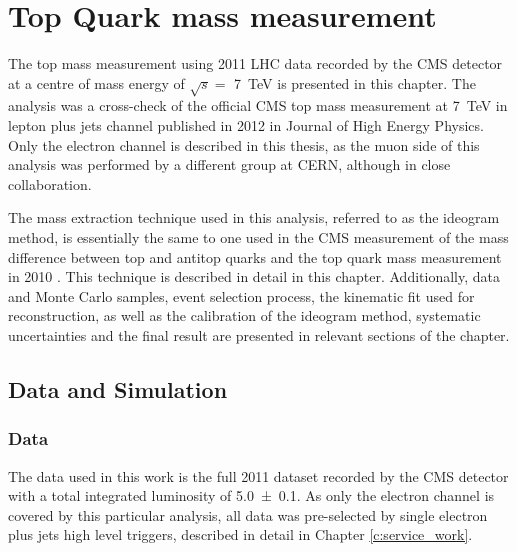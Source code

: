 
\chapter{Top Quark mass measurement}
\label{c:top_mass_analysis}
\ifpdf
    \graphicspath{{05_Mass_analysis/plots/}}
\else
    \graphicspath{{05_Mass_analysis/plots/EPS/}{05_Mass_analysis/plots/}}
\fi

The top mass measurement using 2011 LHC data recorded by the CMS detector at a centre of mass energy of $\sqrt s =$
\SI{7}{\TeV} is presented in this chapter. The analysis was a cross-check of the official CMS top mass measurement at
\SI{7}{\TeV} in lepton plus jets channel published in 2012 \autocite{top_mass_ljets_CMS} in Journal of High Energy
Physics. Only the electron channel is described in this thesis, as the muon side of this analysis was performed by a
different group at CERN, although in close collaboration.

The mass extraction technique used in this analysis, referred to as the ideogram method, is essentially the same to one
used in the CMS measurement of the mass difference between top and antitop quarks \autocite{mass_difference_CMS} and the
top quark mass measurement in 2010 \autocite{top_mass_ljets_CMS_2010}. This technique is described in detail in this
chapter. Additionally, data and Monte Carlo samples, event selection process, the kinematic fit used for \ttbar
reconstruction, as well as the calibration of the ideogram method, systematic uncertainties and the final result are
presented in relevant sections of the chapter.

\section{Data and Simulation}
\label{s_top_mass:data_and_simulation}

\subsection{Data}
\label{ss_top_mass:data}
The data used in this work is the full 2011 dataset recorded by the CMS detector with a total integrated luminosity of
\SI{5.0 \pm 0.1}{\fbinv}. As only the electron channel is covered by this particular analysis, all data was pre-selected
by single electron plus jets high level triggers, described in detail in Chapter \ref{c:service_work}.



